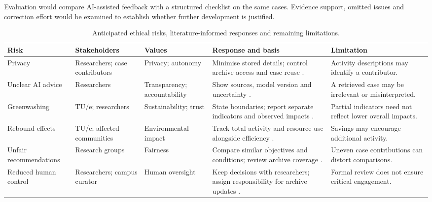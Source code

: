 \documentclass[11pt,a4paper]{article}
\renewcommand{\arraystretch}{1.15}
\begin{document}
Evaluation would compare AI-assisted feedback with a structured checklist on the same cases. Evidence support, omitted issues and correction effort would be examined to establish whether further development is justified.

\begin{table}[!htbp]
\centering
\footnotesize
\setlength{\tabcolsep}{4pt}
\renewcommand{\arraystretch}{1.35}
\begin{tabularx}{\textwidth}{@{}>{\raggedright\arraybackslash}p{}>{\raggedright\arraybackslash}p{}>{\raggedright\arraybackslash}p{}>{\raggedright\arraybackslash}X>{\raggedright\arraybackslash}p{}@{}}
\toprule
Risk & Stakeholders & Values & Response and basis & Limitation \\
\midrule
Privacy & Researchers; case contributors & Privacy; autonomy & Minimise stored details; control archive access and case reuse \citep{hasselbalch2025sustainability}. & Activity descriptions may identify a contributor. \\
\midrule
Unclear AI advice & Researchers & Transparency; accountability & Show sources, model version and uncertainty \citep{lacoste2019carbon}. & A retrieved case may be irrelevant or misinterpreted. \\
\midrule
Greenwashing & TU/e; researchers & Sustainability; trust & State boundaries; report separate indicators and observed impacts \citep{lin2023cost}. & Partial indicators need not reflect lower overall impacts. \\
\midrule
Rebound effects & TU/e; affected communities & Environmental impact & Track total activity and resource use alongside efficiency \citep{luccioni2025rebound}. & Savings may encourage additional activity. \\
\midrule
Unfair recommendations & Research groups & Fairness & Compare similar objectives and conditions; review archive coverage \citep{hasselbalch2025sustainability}. & Uneven case contributions can distort comparisons. \\
\midrule
Reduced human control & Researchers; campus curator & Human oversight & Keep decisions with researchers; assign responsibility for archive updates \citep{santoni2018control}. & Formal review does not ensure critical engagement. \\
\bottomrule
\end{tabularx}
\caption{Anticipated ethical risks, literature-informed responses and remaining limitations.}
\label{tab:ethical-risks}
\end{table}
\end{document}
